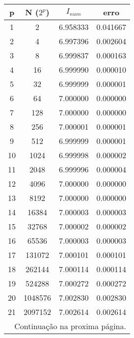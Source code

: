 \documentclass[a4paper,11pt, twoside]{article}
\newcommand{\n}[1]{\textbf{#1}}
\begin{document}
    {\linespread{1}
    \begin{table}[!th]
        \begin{center}
            \begin{tabular}{ c c c c }
                \toprule[0.11em]
                \n{p} & \n{N ($2^p$)} & \n{$I_{num}$} & \n{erro}\\
                \toprule[0.11em]
                1 &        2 & 6.958333 & 0.041667\\
                \midrule
                2 &        4 & 6.997396 & 0.002604\\
                \midrule
                3 &        8 & 6.999837 & 0.000163\\
                \midrule
                4 &       16 & 6.999990 & 0.000010\\
                \midrule
                5 &       32 & 6.999999 & 0.000001\\
                \midrule
                6 &       64 & 7.000000 & 0.000000\\
                \midrule
                7 &      128 & 7.000000 & 0.000000\\
                \midrule
                8 &      256 & 7.000001 & 0.000001\\
                \midrule
                9 &      512 & 6.999999 & 0.000001\\
                \midrule
                10 &     1024 & 6.999998 & 0.000002\\
                \midrule
                11 &     2048 & 6.999996 & 0.000004\\
                \midrule
                12 &     4096 & 7.000000 & 0.000000\\
                \midrule
                13 &     8192 & 7.000000 & 0.000000\\
                \midrule
                14 &    16384 & 7.000003 & 0.000003\\
                \midrule
                15 &    32768 & 7.000002 & 0.000002\\
                \midrule
                16 &    65536 & 7.000003 & 0.000003\\
                \midrule
                17 &   131072 & 7.000101 & 0.000101\\
                \midrule
                18 &   262144 & 7.000114 & 0.000114\\
                \midrule
                19 &   524288 & 7.000272 & 0.000272\\
                \midrule
                20 &  1048576 & 7.002830 & 0.002830\\
                \midrule
                21 &  2097152 & 7.002614 & 0.002614\\
                \midrule
                \multicolumn{4}{r}{{\small Continuação na proxima página.}}\\
                \midrule
            \end{tabular}
        \end{center}
    \end{table}}
    
\end{document}
